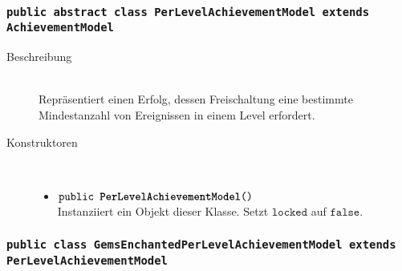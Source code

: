 		\subsubsection{\normalfont \texttt{public abstract class \textbf{PerLevelAchievementModel} extends AchievementModel}}
		
		\begin{description}
		\item[Beschreibung] \hfill \\ Repräsentiert einen Erfolg, dessen Freischaltung eine bestimmte Mindestanzahl von Ereignissen in einem Level erfordert.
		
		\item[Konstruktoren] \hfill \\
			\vspace{-.8cm}
			\begin{itemize}
				\item $\texttt{public \textbf{PerLevelAchievementModel}()}$ \\ Instanziiert ein Objekt dieser Klasse. Setzt $\texttt{locked}$ auf $\texttt{false}$.
			\end{itemize}
		
		\end{description}
		
		
		
		\subsubsection{\normalfont \texttt{public class \textbf{GemsEnchantedPerLevelAchievementModel} extends PerLevelAchievementModel}}
		
